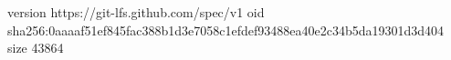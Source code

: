 version https://git-lfs.github.com/spec/v1
oid sha256:0aaaaf51ef845fac388b1d3e7058c1efdef93488ea40e2c34b5da19301d3d404
size 43864
